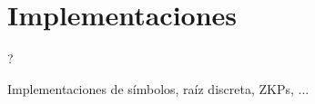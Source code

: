 \chapter{Implementaciones}\label{ch:implementaciones} 

?

Implementaciones de símbolos, raíz discreta, ZKPs, ...